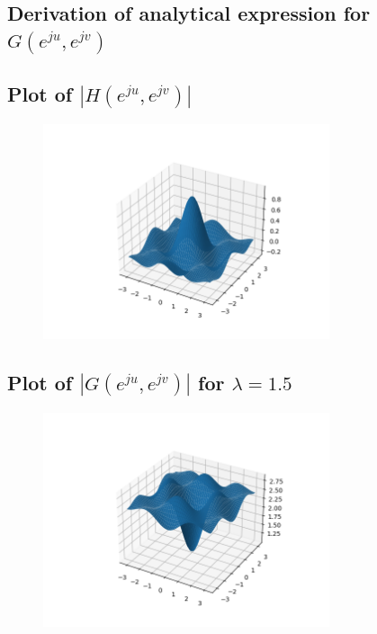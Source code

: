 \documentclass{article}
\begin{document}
\subsection{Derivation of analytical expression for $G(e^{ju}, e^{jv})$}
\subsection{Plot of $|H(e^{ju}, e^{jv})|$}
\begin{figure}[H]
    \centering
    \includegraphics[width=0.75\textwidth]{../results/section4-H-python.png}
    \begin{center}
    \end{center}
    \label{fig:A1}
\end{figure}
\subsection{Plot of $|G(e^{ju}, e^{jv})|$ for $\lambda = 1.5$}
\begin{figure}[H]
    \centering
    \includegraphics[width=0.75\textwidth]{../results/section4-G-python.png}
    \begin{center}
    \end{center}
    \label{fig:A1}
\end{figure}
\end{document}
